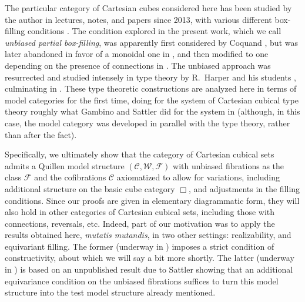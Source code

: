 \documentclass[11pt,reqno]{amsart}
\newcommand{\CC}{\ensuremath{\mathcal{C}}}
\newcommand{\WW}{\ensuremath{\mathcal{W}}}
\newcommand{\FF}{\ensuremath{\mathcal{F}}}
\theoremstyle{remark}
\theoremstyle{definition}
\begin{document}
The particular category of Cartesian cubes considered here has been studied by the author in lectures, notes, and papers since 2013, with various different box-filling conditions \cite{Awodey:cubical-model,awodey19cmu}.  The condition explored in the present work, which we call \emph{unbiased partial box-filling}, was apparently first considered by Coquand \cite{Coq:cartesian}, but was later abandoned in favor of a monoidal one in \cite{BCH}, and then modified to one depending on the presence of connections in \cite{CCHM:2018ctt}.  The unbiased approach was resurrected and studied intensely in type theory by R.~Harper and his students \cite{BL:2014,AngiuliHarperWilson17,AngiuliFavoniaHarper18,Angiuli:2019}, culminating in \cite{ABCHFL}.   These type theoretic constructions are analyzed here in terms of model categories for the first time, doing for the system of Cartesian cubical type theory roughly what Gambino and Sattler \cite{GS,Sattler:2017ee} did for the system in \cite{CCHM:2018ctt} (although, in this case, the model category was developed in parallel with the type theory, rather than after the fact).

Specifically, we ultimately show that the category of Cartesian cubical sets admits a Quillen model structure $(\CC, \WW, \FF)$ with unbiased fibrations as the class $\FF$ and the cofibrations $\CC$ axiomatized to allow for variations, including additional structure on the basic cube category $\Box$, and adjustments in the filling conditions.  Since our proofs are given in elementary diagrammatic form, they will also hold in other categories of Cartesian cubical sets, including those with connections, reversals, etc.  Indeed, part of our motivation was to apply the results obtained here, \emph{mutatis mutandis}, in two other settings: realizability, and equivariant filling.  The former (underway in \cite{AAFS}) imposes a strict condition of constructivity, about which we will say a bit more shortly.   The latter (underway in \cite{ACCRS}) is based on an unpublished result due to Sattler showing that an additional equivariance condition on the unbiased fibrations suffices to turn this model structure into the test model structure already mentioned.  
\end{document}
